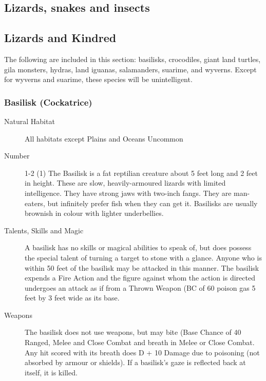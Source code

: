 \begin{multicols}{2}

\setlength\columnseprule{0.2mm}

\section{Lizards, snakes and insects}

\subsection{Lizards and Kindred}
The following are included in this section: basilisks, crocodiles,
giant land turtles, gila monsters, hydras, land iguanas, salamanders,
suarime, and wyverns.  Except for wyverns and suarime, these species
will be unintelligent.

\subsubsection{Basilisk (Cockatrice)}

\begin{description}
\item[Natural Habitat] All habitats except Plains and Oceans Uncommon

\item[Number] 1-2 (1)
 The Basilisk is a fat reptilian creature about 5 feet
long and 2 feet in height. These are slow, heavily-armoured lizards
with limited intelligence.  They have strong jaws with two-inch
fangs.  They are man-eaters, but infinitely prefer fish when they can
get it.  Basilisks are usually brownish in colour with lighter
underbellies.

\item[Talents, Skills and Magic] A basilisk has no skills or magical abilities to speak of,
but does possess the special talent of turning a target to stone with
a glance.  Anyone who is within 50 feet of the basilisk may be
attacked in this manner.  The basilisk expends a Fire Action and the
figure against whom the action is directed undergoes an attack as if
from a Thrown Weapon (BC of 60%
poison gas 5 feet by 3 feet wide as its base.

\item[Weapons] The basilisk does not use weapons, but may bite (Base Chance
of 40%
Ranged, Melee and Close Combat and breath in Melee or Close Combat.
Any hit scored with its breath does D + 10 Damage due to poisoning
(not absorbed by armour or shields). If a basilisk's gaze is reflected
back at itself, it is killed.



\end{description}
\end{multicols}
